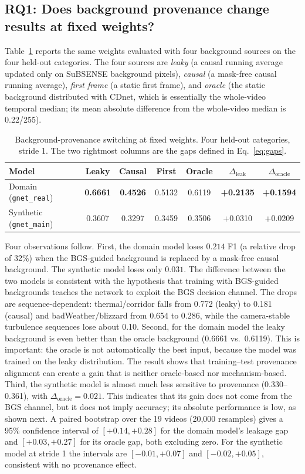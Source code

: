 \documentclass[sn-mathphys-num,iicol]{sn-jnl}
\begin{document}
\subsection{RQ1: Does background provenance change results at fixed weights?}\label{sec:rq1}

Table~\ref{tab:provenance} reports the same weights evaluated with four
background sources on the four held-out categories. The four sources are
\emph{leaky} (a causal running average updated only on SuBSENSE background
pixels), \emph{causal} (a mask-free causal running average), \emph{first frame}
(a static first frame), and \emph{oracle} (the static background distributed with
CDnet, which is essentially the whole-video temporal median; its mean absolute
difference from the whole-video median is 0.22/255).

\begin{table}[t]
\centering
\small
\caption{Background-provenance switching at fixed weights. Four held-out
categories, stride 1. The two rightmost columns are the gaps defined in
Eq.~\eqref{eq:gaps}.}
\label{tab:provenance}
\begin{tabular}{lcccccc}
\toprule
Model & Leaky & Causal & First & Oracle & $\Delta_{\mathrm{leak}}$ & $\Delta_{\mathrm{oracle}}$ \\
\midrule
Domain (\texttt{gnet\_real}) & \textbf{0.6661} & \textbf{0.4526} & 0.5132 & 0.6119 & \textbf{+0.2135} & \textbf{+0.1594} \\
Synthetic (\texttt{gnet\_main}) & 0.3607 & 0.3297 & 0.3459 & 0.3506 & +0.0310 & +0.0209 \\
\bottomrule
\end{tabular}
\end{table}

Four observations follow. First, the domain model loses $0.214$ F1 (a relative
drop of 32\%) when the BGS-guided background is replaced by a mask-free causal
background. The synthetic model loses only $0.031$. The difference between the
two models is consistent with the hypothesis that training with BGS-guided
backgrounds teaches the network to exploit the BGS decision channel. The drops
are sequence-dependent: thermal/corridor falls from 0.772 (leaky) to 0.181
(causal) and badWeather/blizzard from 0.654 to 0.286, while the camera-stable
turbulence sequences lose about 0.10. Second, for
the domain model the leaky background is even better than the oracle background
(0.6661 vs.\ 0.6119). This is important: the oracle is not automatically the best
input, because the model was trained on the leaky distribution. The result shows
that training--test provenance alignment can create a gain that is neither
oracle-based nor mechanism-based. Third, the synthetic model is almost
much less sensitive to provenance (0.330--0.361), with $\Delta_{\mathrm{oracle}}=0.021$.
This indicates that its gain does not come from the BGS channel, but it does not
imply accuracy; its absolute performance is low, as shown next.
A paired bootstrap over the 19 videos (20,000 resamples) gives a 95\% confidence
interval of $[+0.14,+0.28]$ for the domain model's leakage gap and $[+0.03,+0.27]$
for its oracle gap, both excluding zero. For the synthetic model at stride 1 the
intervals are $[-0.01,+0.07]$ and $[-0.02,+0.05]$, consistent with no provenance
effect.
\end{document}
